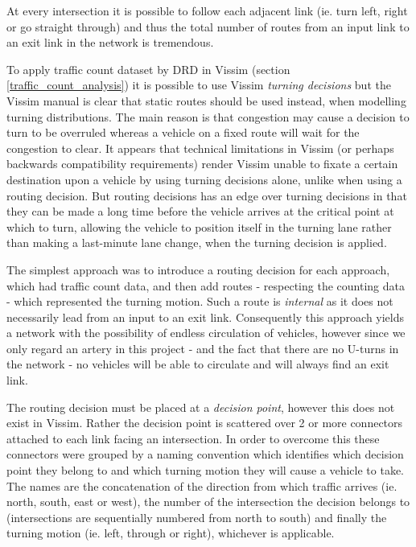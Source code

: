 At every intersection it is possible to follow each adjacent link (ie. turn left, right or go straight through) and thus the total number of routes from an input link to an exit link in the network is tremendous.

To apply traffic count dataset by DRD in Vissim (section \ref{traffic_count_analysis}) it is possible to use Vissim \textit{turning decisions} but the Vissim manual is clear that static routes should be used instead, when modelling turning distributions. The main reason is that congestion may cause a decision to turn to be overruled whereas a vehicle on a fixed route will wait for the congestion to clear. It appears that technical limitations in Vissim (or perhaps backwards compatibility requirements) render Vissim unable to fixate a certain destination upon a vehicle by using turning decisions alone, unlike when using a routing decision. But routing decisions has an edge over turning decisions in that they can be made a long time before the vehicle arrives at the critical point at which to turn, allowing the vehicle to position itself in the turning lane rather than making a last-minute lane change, when the turning decision is applied.

The simplest approach was to introduce a routing decision for each approach, which had traffic count data, and then add routes - respecting the counting data - which represented the turning motion. Such a route is \textit{internal} as it does not necessarily lead from an input to an exit link. Consequently this approach yields a network with the possibility of endless circulation of vehicles, however since we only regard an artery in this project - and the fact that there are no U-turns in the network - no vehicles will be able to circulate and will always find an exit link.

The routing decision must be placed at a \textit{decision point}, however this does not exist in Vissim. Rather the decision point is scattered over 2 or more connectors attached to each link facing an intersection. In order to overcome this these connectors were grouped by a naming convention which identifies which decision point they belong to and which turning motion they will cause a vehicle to take. 
The names are the concatenation of the direction from which traffic arrives (ie. north, south, east or west), the number of the intersection the decision belongs to (intersections are sequentially numbered from north to south) and finally the turning motion (ie. left, through or right), whichever is applicable. 


